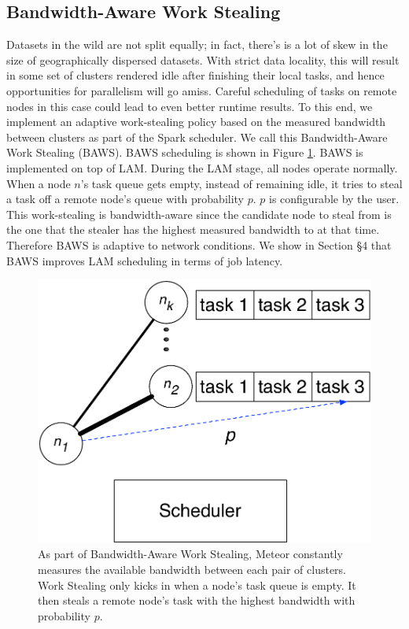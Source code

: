 \subsection{Bandwidth-Aware Work Stealing}

Datasets in the wild are not split equally; in fact, there's is a lot of skew in the size of geographically dispersed datasets.  With strict data locality, this will result in some set of clusters rendered idle after finishing their local tasks, and hence opportunities for parallelism will go amiss.  Careful scheduling of tasks on remote nodes in this case could lead to even better runtime results. To this end, we implement an adaptive work-stealing policy based on the measured bandwidth between clusters as part of the Spark scheduler. We call this Bandwidth-Aware Work Stealing (BAWS). BAWS scheduling is shown in Figure \ref{fig:baws}. BAWS is implemented on top of LAM. During the LAM stage, all nodes operate normally. When a node $n$'s task queue gets empty,
instead of remaining idle, it tries to steal a task off a remote node's queue with probability $p$. $p$ is configurable by the user. This work-stealing is bandwidth-aware since the candidate node to steal from is the one that the stealer has the highest measured bandwidth to at that time. Therefore BAWS is adaptive to network conditions. 
We show in Section \S 4  that BAWS improves LAM scheduling in terms of job latency.

\begin{figure}[!ht]
\centering\includegraphics[width=0.5\columnwidth]{figs/BOSS.pdf}
\vspace{-1.2em}
\caption{As part of Bandwidth-Aware Work Stealing, Meteor constantly measures the available bandwidth between each pair of clusters. Work Stealing only kicks in when a node's task queue is empty. It then steals a remote node's task with the highest bandwidth with probability $p$. }
\label{fig:baws}
\vspace{.7em}
\end{figure}

